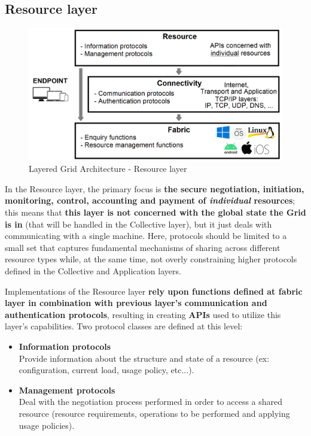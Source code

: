 \subsection{Resource layer}\label{resource_layer}
\begin{figure}[!ht]
    \centering
    \includegraphics[scale=0.35]{document/chapters/chapter_2/images/resource_layer.png}
    \caption{Layered Grid Architecture - Resource layer}
    \label{fig:resource_layer}
\end{figure}

\noindent In the Resource layer, the primary focus is \textbf{the secure negotiation, initiation, monitoring, control, accounting and payment of \textit{individual} resources}; this means that \textbf{this layer is not concerned with the global state the Grid is in} (that will be handled in the Collective layer), but it just deals with communicating with a single machine. Here, protocols should be limited to a small set that captures fundamental mechanisms of sharing across different resource types while, at the same time, not overly constraining higher protocols defined in the Collective and Application layers.

Implementations of the Resource layer \textbf{rely upon functions defined at fabric layer in combination with previous layer's communication and authentication protocols}, resulting in creating \textbf{APIs} used to utilize this layer's capabilities.
Two protocol classes are defined at this level:
\begin{itemize}
    \item \textbf{Information protocols}\\
    Provide information about the structure and state of a resource (ex: configuration, current load, usage policy, etc...).
    \item \textbf{Management protocols}\\
    Deal with the negotiation process performed in order to access a shared resource (resource requirements, operations to be performed and applying usage policies).
\end{itemize} 

